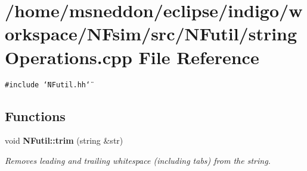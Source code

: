 \section{/home/msneddon/eclipse/indigo/workspace/NFsim/src/NFutil/stringOperations.cpp File Reference}
\label{stringOperations_8cpp}


{\tt \#include \char`\"{}NFutil.hh\char`\"{}}\par
\subsection*{Functions}
\begin{CompactItemize}
\item 
void {\bf NFutil::trim} (string \&str)
\begin{CompactList}\small\item\em Removes leading and trailing whitespace (including tabs) from the string. \item\end{CompactList}\end{CompactItemize}
